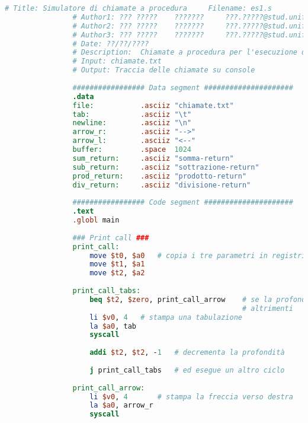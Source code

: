         \begin{center}
           	\begin{lstlisting}[language=mips, gobble=14, stepnumber=1]
                # Title: Simulatore di chiamate a procedura     Filename: es1.s
                # Author1: ??? ?????    ???????     ???.?????@stud.unifi.it
                # Author2: ??? ?????    ???????     ???.?????@stud.unifi.it
                # Author3: ??? ?????    ???????     ???.?????@stud.unifi.it
                # Date: ??/??/????
                # Description:  Chiamate a procedura per l'esecuzione di operazioni aritmetiche
                # Input: chiamate.txt
                # Output: Traccia delle chiamate su console
                
                ################# Data segment #####################
                .data
                file:           .asciiz "chiamate.txt"
                tab:            .asciiz "\t"
                newline:        .asciiz "\n"
                arrow_r:        .asciiz "-->"
                arrow_l:        .asciiz "<--"
                buffer:         .space  1024
                sum_return:     .asciiz "somma-return"
                sub_return:     .asciiz "sottrazione-return"
                prod_return:    .asciiz "prodotto-return"
                div_return:     .asciiz "divisione-return"
                
                ################# Code segment #####################
                .text
                .globl main
                
                ### Print call ###
                print_call:
                    move $t0, $a0   # copia i tre parametri in registri temporanei
                    move $t1, $a1
                    move $t2, $a2
                    
                print_call_tabs:
                    beq $t2, $zero, print_call_arrow    # se la profondità è 0, allora procede a stampare la stringa
                                                        # altrimenti
                    li $v0, 4   # stampa una tabulazione
                    la $a0, tab
                    syscall
                    
                    addi $t2, $t2, -1   # decrementa la profondità
                    
                    j print_call_tabs   # ed esegue un altro ciclo
                    
                print_call_arrow:
                    li $v0, 4       # stampa la freccia verso destra
                    la $a0, arrow_r
                    syscall
                    

\end{lstlisting}
\end{center}
